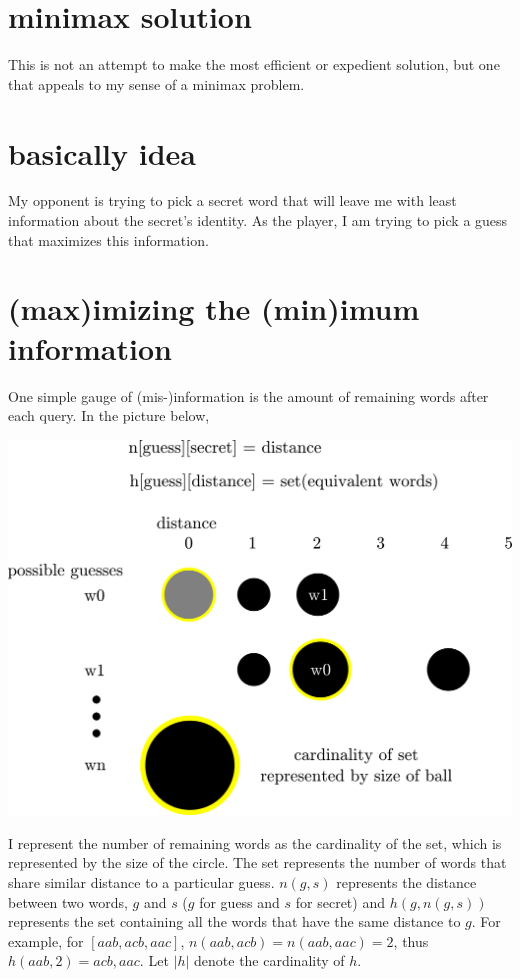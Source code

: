 \documentclass[11pt]{article}
\begin{document}
\section{minimax solution}
\label{sec:org5059eb0}

This is not an attempt to make the most efficient or expedient
solution, but one that appeals to my sense of a minimax problem.

\section{basically idea}
\label{sec:org861c5b7}

My opponent is trying to pick a secret word that will leave me with
least information about the secret's identity.  As the player, I am
trying to pick a guess that maximizes this information.

\section{(max)imizing the (min)imum information}
\label{sec:org43519fe}

One simple gauge of (mis-)information is the amount of remaining words after
each query.  In the picture below,

\begin{center}
\includegraphics[width=.9\linewidth]{./guess.png}
\end{center}

I represent the number of remaining words as the cardinality of the
set, which is represented by the size of the circle.  The set
represents the number of words that share similar distance to a
particular guess.  \(n(g,s)\) represents the distance between two words,
\(g\) and \(s\) (\(g\) for guess and \(s\) for secret) and \(h(g,n(g,s))\)
represents the set containing all the words that have the same
distance to \(g\).  For example, for \([aab, acb, aac]\), \(n(aab, acb) =
n(aab, aac) = 2\), thus \(h(aab, 2) = {acb, aac}\).  Let \(|h|\) denote the
cardinality of \(h\).
\end{document}
